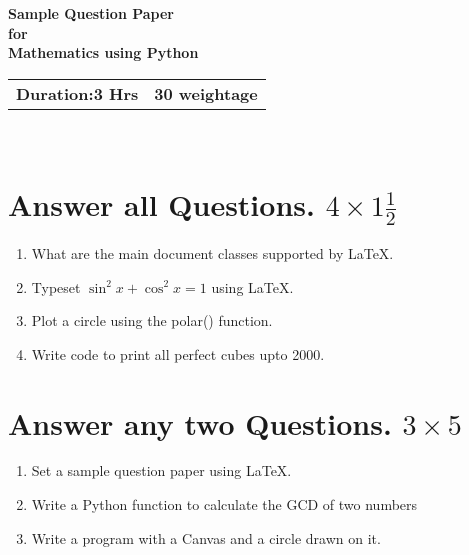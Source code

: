 \documentclass{article}
\begin{document}
\begin{center}
\large{\textbf{Sample Question Paper\\for\\Mathematics using Python}}
\end{center}

\begin{tabular}{p{8cm}r}
\textbf{Duration:3 Hrs} & \textbf{30 weightage}
\end{tabular}\\


\section{Answer all Questions. $4\times 1\frac{1}{2}$}

\begin{enumerate}
\item What are the main document classes supported by LaTeX.
\item Typeset $\sin^{2}x+\cos^{2}x=1$ using LaTeX.
\item Plot a circle using the polar() function.
\item Write code to print all perfect cubes upto 2000.
\end{enumerate}


\section{Answer any two Questions. $3\times 5$}

\begin{enumerate}
\item Set a sample question paper using LaTeX.
\item Write a Python function to calculate the GCD of two numbers
\item Write a program with a Canvas and a circle drawn on it.
\end{enumerate}


\begin{center}\end{center}
\end{document}
